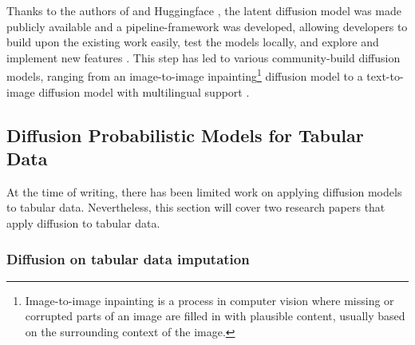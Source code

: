 Thanks to the authors of \cite{rombach2022HighResolutionImageSynthesis} and Huggingface \cite{huggingface2023HuggingFaceAI}, the latent diffusion model was made publicly available and a
pipeline-framework was developed, allowing developers to build upon the existing work easily, test the models locally, and explore and implement new features \cite{huggingface2023DiffusersPipelines}.
This step has led to various community-build diffusion models, ranging from an image-to-image inpainting\footnote{Image-to-image inpainting is a process in computer vision where missing or corrupted parts of an image are filled in with plausible content, usually based on the surrounding context of the image.} diffusion model to a text-to-image diffusion model with multilingual support \cite{huggingface2023CommunityExamples}.

\subsection{Diffusion Probabilistic Models for Tabular Data}
\label{ch:preliminaries-generativeAlgorithms-diffusionProbabilisticModelsTabularData}
At the time of writing, there has been limited work on applying diffusion models to tabular data.
Nevertheless, this section will cover two research papers that apply diffusion to tabular data.

\subsubsection{Diffusion on tabular data imputation}

